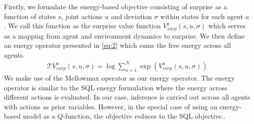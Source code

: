 \documentclass{article}
\begin{document}
\begin{multicols}{2}
Firstly, we formulate the energy-based objective consisting of surprise as a function of states $s$, joint actions $u$ and deviation $\sigma$ within states for each agent $a$. We call this function as the surprise value function $V_{surp}^{a}(s,u,\sigma)$ which serves as a mapping from agent and environment dynamics to surprise. We then define an energy operator presented in \autoref{eq:2} which sums the free energy across all agents. 
\begin{gather}
    \mathcal{T}V^{a}_{surp}(s,u,\sigma) = \log \sum_{a=1}^{N} \exp{(V^{a}_{surp}(s,u,\sigma))} \label{eq:2}
\end{gather}
We make use of the Mellowmax operator \cite{mellowmax} as our energy operator. The energy operator is similar to the SQL energy formulation \cite{sql} where the energy across different actions is evaluated. In our case, inference is carried out across all agents with actions as prior variables. However, in the special case of using an energy-based model as a $Q$-function, the objective reduces to the SQL objective.. 


\end{multicols}
\end{document}
